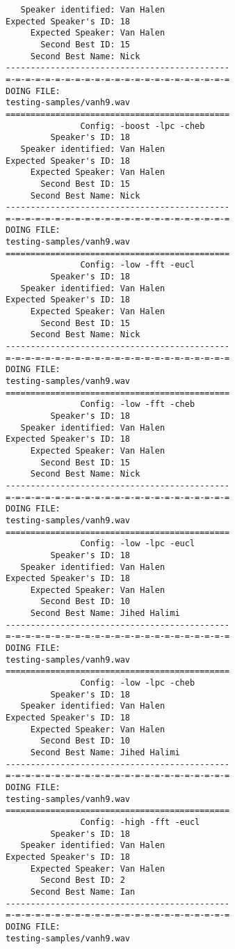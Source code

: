 \begin{verbatim}
   Speaker identified: Van Halen
Expected Speaker's ID: 18
     Expected Speaker: Van Halen
       Second Best ID: 15
     Second Best Name: Nick
---------------------------------------------
=-=-=-=-=-=-=-=-=-=-=-=-=-=-=-=-=-=-=-=-=-=-=
DOING FILE:
testing-samples/vanh9.wav
=============================================
               Config: -boost -lpc -cheb
         Speaker's ID: 18
   Speaker identified: Van Halen
Expected Speaker's ID: 18
     Expected Speaker: Van Halen
       Second Best ID: 15
     Second Best Name: Nick
---------------------------------------------
=-=-=-=-=-=-=-=-=-=-=-=-=-=-=-=-=-=-=-=-=-=-=
DOING FILE:
testing-samples/vanh9.wav
=============================================
               Config: -low -fft -eucl
         Speaker's ID: 18
   Speaker identified: Van Halen
Expected Speaker's ID: 18
     Expected Speaker: Van Halen
       Second Best ID: 15
     Second Best Name: Nick
---------------------------------------------
=-=-=-=-=-=-=-=-=-=-=-=-=-=-=-=-=-=-=-=-=-=-=
DOING FILE:
testing-samples/vanh9.wav
=============================================
               Config: -low -fft -cheb
         Speaker's ID: 18
   Speaker identified: Van Halen
Expected Speaker's ID: 18
     Expected Speaker: Van Halen
       Second Best ID: 15
     Second Best Name: Nick
---------------------------------------------
=-=-=-=-=-=-=-=-=-=-=-=-=-=-=-=-=-=-=-=-=-=-=
DOING FILE:
testing-samples/vanh9.wav
=============================================
               Config: -low -lpc -eucl
         Speaker's ID: 18
   Speaker identified: Van Halen
Expected Speaker's ID: 18
     Expected Speaker: Van Halen
       Second Best ID: 10
     Second Best Name: Jihed Halimi
---------------------------------------------
=-=-=-=-=-=-=-=-=-=-=-=-=-=-=-=-=-=-=-=-=-=-=
DOING FILE:
testing-samples/vanh9.wav
=============================================
               Config: -low -lpc -cheb
         Speaker's ID: 18
   Speaker identified: Van Halen
Expected Speaker's ID: 18
     Expected Speaker: Van Halen
       Second Best ID: 10
     Second Best Name: Jihed Halimi
---------------------------------------------
=-=-=-=-=-=-=-=-=-=-=-=-=-=-=-=-=-=-=-=-=-=-=
DOING FILE:
testing-samples/vanh9.wav
=============================================
               Config: -high -fft -eucl
         Speaker's ID: 18
   Speaker identified: Van Halen
Expected Speaker's ID: 18
     Expected Speaker: Van Halen
       Second Best ID: 2
     Second Best Name: Ian
---------------------------------------------
=-=-=-=-=-=-=-=-=-=-=-=-=-=-=-=-=-=-=-=-=-=-=
DOING FILE:
testing-samples/vanh9.wav

\end{verbatim}

